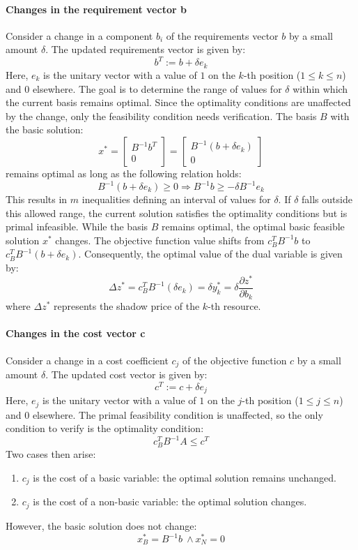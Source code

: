 \paragraph*{Changes in the requirement vector b}
Consider a change in a component $b_i$ of the requirements vector $b$ by a small amount $\delta$.
The updated requirements vector is given by:
\[ b^T := b + \delta e_k \]
Here, $e_k$ is the unitary vector with a value of $1$ on the $k$-th position ($1 \leq k \leq n$) and $0$ elsewhere.
The goal is to determine the range of values for $\delta$ within which the current basis remains optimal. 
Since the optimality conditions are unaffected by the change, only the feasibility condition needs verification.
The basis $B$ with the basic solution: 
\[ x^{*} = \begin{bmatrix} B^{-1} b^T \\ 0 \end{bmatrix} = \begin{bmatrix} B^{-1} \left( b + \delta e_k \right) \\ 0 \end{bmatrix} \]
remains optimal as long as the following relation holds:
\[ B^{-1} \left( b + \delta e_k \right) \geq 0 \Rightarrow B^{-1} b \geq - \delta B^{-1} e_k \]
This results in $m$ inequalities defining an interval of values for $\delta$.
If $\delta$ falls outside this allowed range, the current solution satisfies the optimality conditions but is primal infeasible.
While the basis $B$ remains optimal, the optimal basic feasible solution $x^{*}$ changes.
The objective function value shifts from $c_B^T B^{-1} b$ to $c_B^T B^{-1} \left( b + \delta e_k \right)$. 
Consequently, the optimal value of the dual variable is given by:
\[ \Delta z^{*} = c_B^T B^{-1} \left( \delta e_k \right) = \delta  y_k^{*} = \delta  \dfrac{\partial z^{*}}{\partial b_k}\]
where $\Delta z^{*}$ represents the shadow price of the $k$-th resource.

\paragraph*{Changes in the cost vector c}
Consider a change in a cost coefficient $c_j$ of the objective function $c$ by a small amount $\delta$.
The updated cost vector is given by:
\[ c^T := c + \delta  e_j \]
Here, $e_j$ is the unitary vector with a value of $1$ on the $j$-th position ($1 \leq j \leq n$) and $0$ elsewhere.
The primal feasibility condition is unaffected, so the only condition to verify is the optimality condition:
\[ c^T_B B^{-1} A \leq c^T \]
Two cases then arise:
\begin{enumerate}
  \item $c_j$ is the cost of a basic variable: the optimal solution remains unchanged.
  \item $c_j$ is the cost of a non-basic variable: the optimal solution changes.
\end{enumerate}
However, the basic solution does not change:
\[ x_B^{*} = B^{-1} b \ \land x_N^{*} = 0 \]

